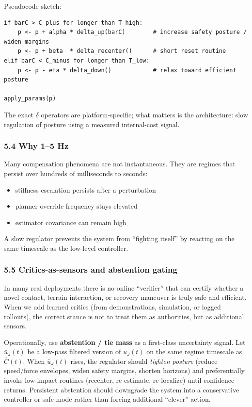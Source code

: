 \documentclass[11pt]{article}
\providecommand{\tightlist}{%
  \setlength{\itemsep}{0pt}\setlength{\parskip}{0pt}}
\begin{document}
Pseudocode sketch:

\begin{verbatim}
if barC > C_plus for longer than T_high:
    p <- p + alpha * delta_up(barC)        # increase safety posture / widen margins
    p <- p + beta  * delta_recenter()      # short reset routine
elif barC < C_minus for longer than T_low:
    p <- p - eta * delta_down()            # relax toward efficient posture

apply_params(p)
\end{verbatim}

The exact \(\delta\) operators are platform-specific; what matters is the architecture: slow regulation of posture using a measured internal-cost signal.

\hypertarget{why-15-hz}{%
\subsubsection{5.4 Why 1--5 Hz}\label{why-15-hz}}

Many compensation phenomena are not instantaneous. They are regimes that persist over hundreds of milliseconds to seconds:

\begin{itemize}
\tightlist
\item
  stiffness escalation persists after a perturbation
\item
  planner override frequency stays elevated
\item
  estimator covariance can remain high
\end{itemize}

A slow regulator prevents the system from ``fighting itself'' by reacting on the same timescale as the low-level controller.

\hypertarget{critics-as-sensors-and-abstention-gating}{%
\subsubsection{5.5 Critics-as-sensors and abstention gating}\label{critics-as-sensors-and-abstention-gating}}

In many real deployments there is no online ``verifier'' that can certify whether a novel contact, terrain interaction, or recovery maneuver is truly safe and efficient. When we add learned critics (from demonstrations, simulation, or logged rollouts), the correct stance is not to treat them as authorities, but as additional sensors.

Operationally, use \textbf{abstention / tie mass} as a first-class uncertainty signal. Let \(\bar u_{J}(t)\) be a low-pass filtered version of \(u_{J}(t)\) on the same regime timescale as \(\bar C(t)\). When \(\bar u_{J}(t)\) rises, the regulator should \emph{tighten posture} (reduce speed/force envelopes, widen safety margins, shorten horizons) and preferentially invoke low-impact routines (recenter, re-estimate, re-localize) until confidence returns. Persistent abstention should downgrade the system into a conservative controller or safe mode rather than forcing additional ``clever'' action.
\end{document}
